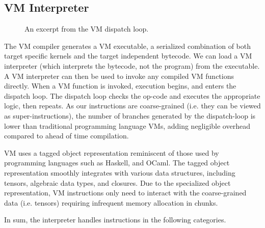 \subsection{VM Interpreter}

\begin{figure}[th]
  
  \caption{An excerpt from the VM dispatch loop.}
  \label{fig:vm_interpreter}
\end{figure}

The VM compiler generates a VM executable,
  a serialized combination of both target specific kernels
  and the target independent bytecode.
We can load a VM interpreter (which interprets the bytecode, not the program) from the executable.
A VM interpreter can then be used to invoke any compiled VM
  functions directly.
When a VM function is invoked,
  execution begins, and enters the dispatch loop.
The dispatch loop checks the op-code and executes
  the appropriate logic, then repeats.
As our instructions are coarse-grained (i.e. they can be viewed as super-instructions),
  the number of branches generated by the dispatch-loop is lower
  than traditional programming language VMs,
  adding negligible overhead compared to ahead of time compilation.

VM uses a tagged object representation reminiscent of those
  used by programming languages such as Haskell, and OCaml.
The tagged object representation smoothly integrates
  with various data structures, including tensors,
  algebraic data types, and closures.
Due to the specialized object representation,
  VM instructions only need to interact with the
  coarse-grained data (i.e. tensors)
  requiring infrequent memory allocation in chunks.

In sum, the interpreter handles instructions in the following categories.

